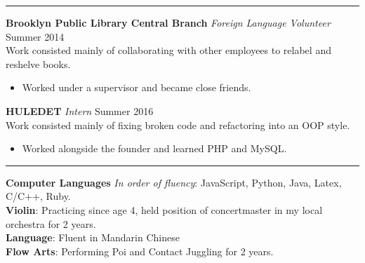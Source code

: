 \documentclass[14]{article}
\begin{document}
  \vspace{0.1cm} \hrule \vspace{0.2cm}
  \noindent\textbf{Brooklyn Public Library Central Branch}\textit{ Foreign Language Volunteer}
  \hfill Summer 2014\\
  Work consisted mainly of collaborating with other employees to relabel and reshelve books.
  \begin{itemize}[label={--},noitemsep, topsep=0pt]
    \item Worked under a supervisor and became close friends.
  \end{itemize}
  \noindent\textbf{HULEDET}\textit{ Intern }
  \hfill Summer 2016\\
  Work consisted mainly of fixing broken code and refactoring into an OOP style.
  \begin{itemize}[label={--},noitemsep, topsep=0pt]
    \item Worked alongside the founder and learned PHP and MySQL.
  \end{itemize}



  \vspace{0.1cm} \hrule \vspace{0.2cm}
  \noindent\textbf{Computer Languages}\textit{ In order of fluency}:
  JavaScript, Python, Java, Latex, C/C++, Ruby.\\
  \textbf{Violin}: Practicing since age 4, held position of concertmaster in my local orchestra for 2 years.\\
  \noindent\textbf{Language}: Fluent in Mandarin Chinese\\
  \textbf{Flow Arts}: Performing Poi and Contact Juggling for 2 years.\\
\end{document}
